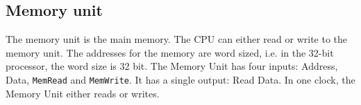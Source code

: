 %
%
%

\subsection{Memory unit}
The memory unit is the main memory. The CPU can either read or write to the
memory unit. The addresses for the memory are word sized, i.e. in the 32-bit
processor, the word size is 32 bit. The Memory Unit has four inputs: Address,
Data, \texttt{MemRead} and \texttt{MemWrite}. It has a single output: Read
Data. In one clock, the Memory Unit either reads or writes.

